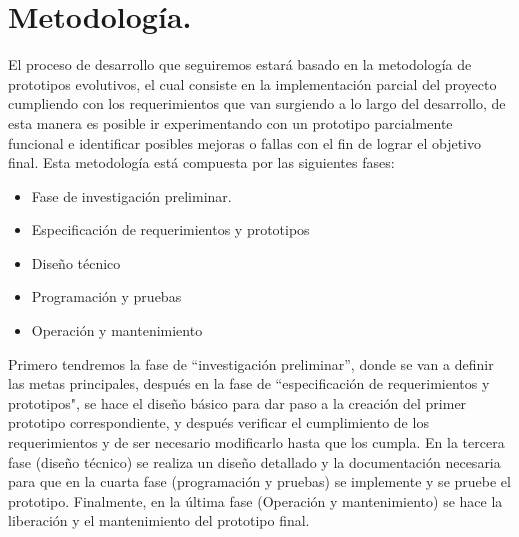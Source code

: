 \documentclass[12pt, a4paper, titlepage]{report}
\begin{document}
	    
	\section{Metodolog\'ia.}
		El proceso de desarrollo que seguiremos estará basado en la metodología de prototipos evolutivos, el cual consiste en la implementación parcial del proyecto cumpliendo con los requerimientos que van surgiendo a lo largo del desarrollo, de esta manera es posible ir experimentando con un prototipo parcialmente funcional e identificar posibles mejoras o fallas con el fin de lograr el objetivo final.
		Esta metodología está compuesta por las siguientes fases:
		\begin{itemize}
		    \item Fase de investigación preliminar.
		    \item Especificación de requerimientos y prototipos
		    \item Diseño técnico
		    \item Programación y pruebas
		    \item Operación y mantenimiento
		\end{itemize}
		
        
        Primero tendremos la fase de “investigación preliminar”, donde se van a definir las metas principales, después en la fase de “especificación de requerimientos y prototipos", se hace el diseño básico para dar paso a la creación del primer prototipo correspondiente, y después verificar el cumplimiento de los requerimientos y de ser necesario modificarlo hasta que los cumpla. En la tercera fase (diseño técnico) se realiza un diseño detallado y la documentación necesaria para que en la cuarta fase (programación y pruebas) se implemente y se pruebe el prototipo. Finalmente, en la última fase (Operación y mantenimiento) se hace la liberación y el mantenimiento del prototipo final.
        
\end{document}
